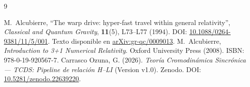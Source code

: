 \documentclass[10pt,a4paper,twocolumn]{article}
\begin{document}
\begin{thebibliography}{9}
    \small\raggedright
    M.~Alcubierre,
    ``The warp drive: hyper-fast travel within general relativity'',
    \textit{Classical and Quantum Gravity}, \textbf{11}(5), L73--L77 (1994).
    DOI: \href{https://doi.org/10.1088/0264-9381/11/5/001}{10.1088/0264-9381/11/5/001}.
    Texto disponible en \href{https://arxiv.org/abs/gr-qc/0009013}{arXiv:gr-qc/0009013}.
    M.~Alcubierre,
    \textit{Introduction to 3+1 Numerical Relativity}.
    Oxford University Press (2008).
    ISBN: 978-0-19-920567-7.
    Carrasco Ozuna, G. (2026).
    \textit{Teoría Cromodinámica Sincrónica --- TCDS: Pipeline de relación H--LI}
    (Version v1.0). Zenodo.
    DOI: \href{https://doi.org/10.5281/zenodo.22639220}{10.5281/zenodo.22639220}.
\end{thebibliography}
\end{document}
